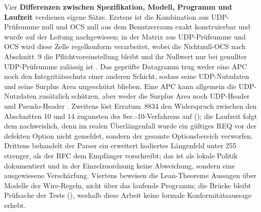 Vier \textbf{Differenzen zwischen Spezifikation, Modell, Programm und Laufzeit} verdienen eigene
Sätze. Erstens ist die Kombination aus UDP-Prüfsumme null und OCS null aus dem Benutzerraum exakt
konstruierbar und wurde auf der Leitung nachgewiesen; in der Matrix aus UDP-Prüfsumme und OCS wird
diese Zelle regel\-konform verarbeitet, wobei die Nichtnull-OCS nach Abschnitt~9 die Pflicht\-voreinstellung
bleibt und ihr Nullwert nur bei genullter UDP-Prüfsumme zulässig ist \cite[Sec.~9]{rfc9868}. Das
geprüfte Datagramm trug weder eine APC noch den
Integritäts\-schutz einer anderen Schicht, sodass seine UDP-Nutzdaten und seine Surplus Area ungeschützt
blieben. Eine APC kann allgemein die UDP-Nutzdaten zusätzlich schützen, aber weder die Surplus Area
noch UDP-Header und Pseudo-Header \cite[Sec.~11.3]{rfc9868}. Zweitens löst
Erratum~8834 den Widerspruch zwischen den Abschnitten 10 und 14 zugunsten des Sec.-10-Verfahrens auf
(); die Laufzeit folgt dem nachweislich, denn im realen Überlängenfall wurde
ein gültiges REQ vor der defekten Option nicht gemeldet, sondern der gesamte Optionsbereich verworfen.
Drittens behandelt der Parser ein erweitert kodiertes Längenfeld unter 255 strenger, als der RFC dem
Empfänger vorschreibt; das ist als lokale Politik dokumentiert und in der Einzelzuordnung keine
Abweichung, sondern eine ausgewiesene Verschärfung. Viertens beweisen die Lean-Theoreme Aussagen über
Modelle der Wire-Regeln, nicht über das laufende Programm; die Brücke bleibt Prüfsache der Tests
(), weshalb diese Arbeit keine formale Konformitätsaussage erhebt.

